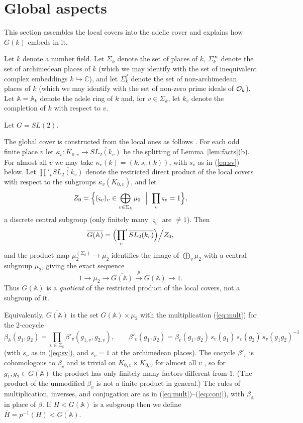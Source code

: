 \documentclass[12pt,letterpaper]{book}
\theoremstyle{plain}
\theoremstyle{definition}
\theoremstyle{remark}
\theoremstyle{remark}
\begin{document}
\section{Global aspects}\label{sec:global}

This section assembles the local covers into the adelic cover and explains how $G(k)$ embeds in it.


Let $k$ denote a number field. Let $\Sigma _k$ denote the set of places of
$k$, $\Sigma _k^\infty $ denote the set of archimedean places of
$k$ (which we may identify with the set of inequivalent
complex embeddings $k\hookrightarrow {\mathbb{C}}$), and let
$\Sigma _k^f$ denote the set of non-archimedean places of
$k$ (which we may identify with the set of non-zero prime ideals of
${\cal{O}}_k$). Let ${\mathbb{A}}={\mathbb{A}}_k$ denote the adele
ring of $k$ and, for $v\in \Sigma _k$, let $k_v$ denote
the completion of $k$ with respect to $v$.

Let $G=SL(2)$.

The global cover is constructed from the local ones as follows
\cite{K2}. For each odd finite place $v$ let
$\kappa_v:K_{0,v}\rightarrow\overline{SL_2(k_v)}$ be the splitting of
Lemma~\ref{lem:facts}(b). For almost all $v$ we may take $\kappa_v(k)=(k,s_v(k))$, with
$s_v$ as in (\ref{eq:sv}) below. Let
$\prod'_v\overline{SL_2(k_v)}$ denote the restricted direct product of the
local covers with respect to the subgroups $\kappa_v(K_{0,v})$, and let
\[
Z_0=\Bigl\{(\varsigma_v)_v\in\bigoplus_{v\in\Sigma_k}\mu_2\ \Bigm|\
\prod_v\varsigma_v=1\Bigr\},
\]
a discrete central subgroup (only finitely many $\varsigma_v$ are
$\neq 1$). Then
\[
\overline{G({\mathbb{A}})}=\Bigl({\prod_v}'\,\overline{SL_2(k_v)}\Bigr)\Big/Z_0 ,
\]
and the product map $\mu_2^{(\Sigma_k)}\rightarrow\mu_2$ identifies the
image of $\bigoplus_v\mu_2$ with a central subgroup $\mu_2$, giving the
exact sequence
\begin{equation}
1\rightarrow \mu _2\rightarrow
\overline{G({\mathbb{A}})}\stackrel{p}{\rightarrow }G({\mathbb{A}})\rightarrow 1.
\end{equation}
Thus $\overline{G({\mathbb{A}})}$ is a \emph{quotient} of the restricted
product of the local covers, not a subgroup of it.

Equivalently, $\overline{G({\mathbb{A}})}$ is the set $G({\mathbb{A}})\times\mu_2$
with the multiplication (\ref{eq:mult}) for the 2-cocycle
\[
\beta_{\mathbb{A}}(g_1,g_2)=\prod_{v\in \Sigma_k}\beta'_v(g_{1,v},g_{2,v}),\qquad
\beta'_v(g_1,g_2)=\beta_v(g_1,g_2)\,s_v(g_1)\,s_v(g_2)\,s_v(g_1g_2)^{-1}
\]
(with $s_v$ as in (\ref{eq:sv}), and $s_v=1$ at the archimedean places). The cocycle $\beta'_v$
is cohomologous to $\beta_v$ and is trivial on $K_{0,v}\times K_{0,v}$ for
almost all $v$ \cite{K2}, so for $g_1,g_2\in G({\mathbb{A}})$ the product
has only finitely many factors different from $1$. (The product of the
unmodified $\beta_v$ is not a finite product in general.) The rules of multiplication, inverses, and conjugation are as in
(\ref{eq:mult})--(\ref{eq:conj}), with $\beta_{\mathbb{A}}$ in place of
$\beta$. If $H<G({\mathbb{A}})$ is a subgroup then we define
$\overline{H}=p^{-1}(H)<\overline{G({\mathbb{A}})}$.
\end{document}
